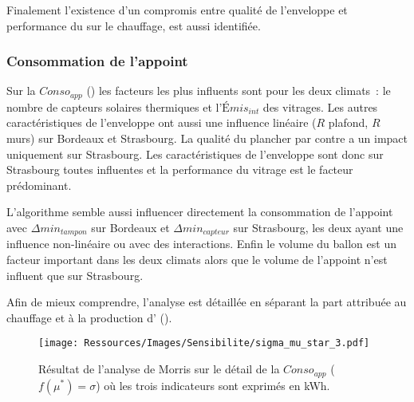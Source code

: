 Finalement l’existence d’un compromis entre qualité de l’enveloppe et performance
du  sur le chauffage, est aussi identifiée.


\subsubsection{Consommation de l’appoint} %
\label{ssub:consommation_de_l_appoint}
Sur la $Conso_{app}$ () les facteurs les plus influents sont
pour les deux climats~: le nombre de capteurs solaires thermiques et l’$Émis_{int}$ des
vitrages. Les autres caractéristiques de l’enveloppe ont aussi une influence linéaire
($R$ plafond, $R$ murs) sur Bordeaux et Strasbourg. La qualité du plancher par contre a un
impact uniquement sur Strasbourg. Les caractéristiques de l’enveloppe sont donc sur
Strasbourg toutes influentes et la performance du vitrage est le facteur prédominant.

L’algorithme semble aussi influencer directement la consommation de l’appoint avec
$\Delta min_{tampon}$ sur Bordeaux et $\Delta min_{capteur}$ sur Strasbourg, les deux
ayant une influence non-linéaire ou avec des interactions. Enfin le volume du ballon
 est un facteur important dans les deux climats alors
que le volume de l’appoint n’est influent que sur Strasbourg.

Afin de mieux comprendre, l’analyse est détaillée en séparant la part attribuée au
chauffage et à la production d’ ().

\begin{figure}
    \centering
    \texttt{[image: Ressources/Images/Sensibilite/sigma\_mu\_star\_3.pdf]}
    \caption[Résultat de l’analyse de Morris sur le détail de la
             $Conso_{app}$ ($f(\mu^{*}) = \sigma$)]
            {Résultat de l’analyse de Morris sur le détail de la
             $Conso_{app}$ ($f(\mu^{*}) = \sigma$) où les trois indicateurs sont exprimés
             en \si{kWh}.}
    \label{fig:conso_app_mu_star}
\end{figure}

